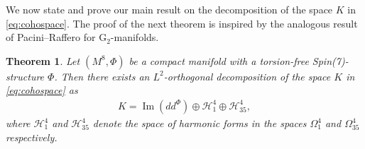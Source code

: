 \documentclass[10pt,a4paper,reqno]{article}
\newtheorem{theorem}{Theorem}[section]
\theoremstyle{definition}
\numberwithin{equation}{section}
\def\G2{\mathrm{G}_2}
\def\ddphi{dd^{\Phi}}
\def\cH{\mathcal{H}}
\DeclareMathOperator{\Ima}{Im}
\begin{document}
We now state and prove our main result on the decomposition of the space $K$ in \cref{eq:cohospace}. The proof of the next theorem is inspired by the analogous result of Pacini--Raffero \cite[Thm. 5.12]{pacini-raferro-pluripotential} for $\G2$-manifolds.

\begin{theorem}\label{thm:Spin7Hodge}
Let $(M^8, \Phi)$ be a compact manifold with a torsion-free Spin(7)-structure $\Phi$. Then there exists an $L^2$-orthogonal decomposition of the space $K$ in \cref{eq:cohospace} as
\begin{align}\label{eq:Spin7Hodge}
K=\Ima(\ddphi) \oplus \cH^4_1\oplus \cH^4_{35},
\end{align}
where $\cH^4_1$ and $\cH^4_{35}$ denote the space of harmonic forms in the spaces $\Omega^4_1$ and $\Omega^4_{35}$ respectively.
\end{theorem}
\end{document}
